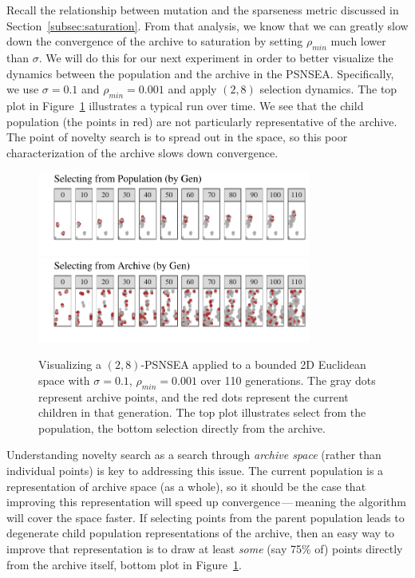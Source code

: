 \documentclass[twoside]{article}
\begin{document}
Recall the relationship between mutation and the sparseness metric discussed in Section~\ref{subsec:saturation}.  From that analysis, we know that we can greatly slow down the convergence of the archive to saturation by setting $\rho_{min}$ much lower than $\sigma$.  We will do this for our next experiment in order to better visualize the dynamics between the population and the archive in the PSNSEA.  Specifically, we use $\sigma=0.1$ and $\rho_{min}=0.001$ and apply $(2,8)$ selection dynamics.  The top plot in Figure~\ref{fig:viz-select} illustrates a typical run over time.  We see that the child population (the points in red) are not particularly representative of the archive.  The point of novelty search is to spread out in the space, so this poor characterization of the archive slows down convergence.
%
\begin{figure}[ht]
  \includegraphics[width=0.8\textwidth]{Figures/viz-archive-and-pop-s01-r0001-mu16lam32-popsel.pdf}\\[-1em]
  \includegraphics[width=0.8\textwidth]{Figures/viz-archive-and-pop-s01-r0001-mu16lam32-archsell.pdf}
  \caption{\label{fig:viz-select} Visualizing a $(2,8)$-PSNSEA applied to a bounded 2D Euclidean space with $\sigma=0.1$, $\rho_{min}=0.001$ over 110 generations.  The gray dots represent archive points, and the red dots represent the current children in that generation.  The top plot illustrates select from the population, the bottom selection directly from the archive.}
\end{figure}

Understanding novelty search as a search through \emph{archive space} (rather than individual points) is key to addressing this issue.  The current population is a representation of archive space (as a whole), so it should be the case that improving this representation will speed up convergence\,---\,meaning the algorithm will cover the space faster.  If selecting points from the parent population leads to degenerate child population representations of the archive, then an easy way to improve that representation is to draw at least \emph{some} (say 75\% of) points directly from the archive itself, bottom plot in Figure~\ref{fig:viz-select}.   
\end{document}
